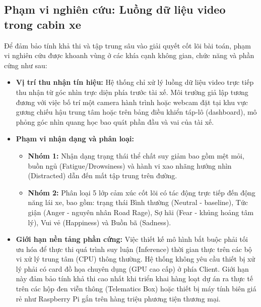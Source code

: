 \documentclass[../DoAn.tex]{subfiles}
\begin{document}
\subsection{Phạm vi nghiên cứu: Luồng dữ liệu video trong cabin xe}
Để đảm bảo tính khả thi và tập trung sâu vào giải quyết cốt lõi bài toán, phạm vi nghiên cứu được khoanh vùng ở các khía cạnh không gian, chức năng và phần cứng như sau:
\begin{itemize}
    \item \textbf{Vị trí thu nhận tín hiệu:} Hệ thống chỉ xử lý luồng dữ liệu video trực tiếp thu nhận từ góc nhìn trực diện phía trước tài xế. Môi trường giả lập tương đương với việc bố trí một camera hành trình hoặc webcam đặt tại khu vực gương chiếu hậu trung tâm hoặc trên bảng điều khiển táp-lô (dashboard), mô phỏng góc nhìn quang học bao quát phần đầu và vai của tài xế.
    
    \item \textbf{Phạm vi nhận dạng và phân loại:}
    \begin{itemize}
        \item \textbf{Nhóm 1:} Nhận dạng trạng thái thể chất suy giảm bao gồm mệt mỏi, buồn ngủ (Fatigue/Drowsiness) và hành vi xao nhãng hướng nhìn (Distracted) dẫn đến mất tập trung trên đường.
        \item \textbf{Nhóm 2:} Phân loại 5 lớp cảm xúc cốt lõi có tác động trực tiếp đến động năng lái xe, bao gồm: trạng thái Bình thường (Neutral - baseline), Tức giận (Anger - nguyên nhân Road Rage), Sợ hãi (Fear - khủng hoảng tâm lý), Vui vẻ (Happiness) và Buồn bã (Sadness).
    \end{itemize}
    
    \item \textbf{Giới hạn nền tảng phần cứng:} Việc thiết kế mô hình bắt buộc phải tối ưu hóa để thực thi quá trình suy luận (Inference) thời gian thực trên các bộ vi xử lý trung tâm (CPU) thông thường. Hệ thống không yêu cầu thiết bị xử lý phải có card đồ họa chuyên dụng (GPU cao cấp) ở phía Client. Giới hạn này đảm bảo tính khả thi cao nhất khi triển khai hàng loạt dự án ra thực tế trên các hộp đen viễn thông (Telematics Box) hoặc thiết bị máy tính biên giá rẻ như Raspberry Pi gắn trên hàng triệu phương tiện thương mại.
\end{itemize}
\end{document}
